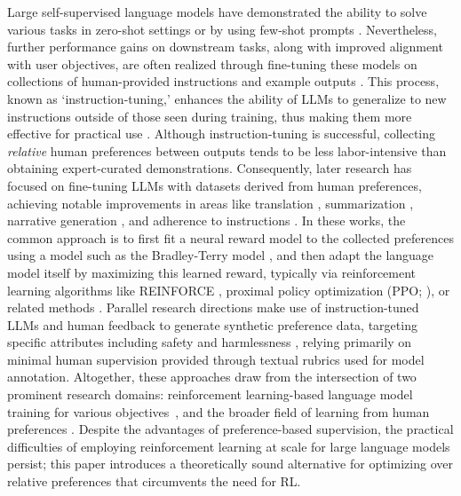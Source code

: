 Large self-supervised language models have demonstrated the ability to solve various tasks in zero-shot settings \citep{radford2019language} or by using few-shot prompts \citep{gpt3,megatron,chowdhery2022palm}. Nevertheless, further performance gains on downstream tasks, along with improved alignment with user objectives, are often realized through fine-tuning these models on collections of human-provided instructions and example outputs \citep{mishra-etal-2022-cross,sanh2022multitask,chung2022scaling,thoppilan2022lamda}. This process, known as `instruction-tuning,' enhances the ability of LLMs to generalize to new instructions outside of those seen during training, thus making them more effective for practical use \citep{chung2022scaling}. Although instruction-tuning is successful, collecting \textit{relative} human preferences between outputs tends to be less labor-intensive than obtaining expert-curated demonstrations. Consequently, later research has focused on fine-tuning LLMs with datasets derived from human preferences, achieving notable improvements in areas like translation \citep{kreutzer-etal-2018-reliability}, summarization \citep{stiennon2022learning,ziegler2020finetuning}, narrative generation \citep{ziegler2020finetuning}, and adherence to instructions \citep{ouyang2022training,ramamurthy2023is}. In these works, the common approach is to first fit a neural reward model to the collected preferences using a model such as the Bradley-Terry model \citep{bradley1952rankanalysis}, and then adapt the language model itself by maximizing this learned reward, typically via reinforcement learning algorithms like REINFORCE \citep{williams1992reinforce}, proximal policy optimization (PPO; \cite{schulman2017proximal}), or related methods \citep{ramamurthy2023is}. Parallel research directions make use of instruction-tuned LLMs and human feedback to generate synthetic preference data, targeting specific attributes including safety and harmlessness \citep{bai2022constitutional}, relying primarily on minimal human supervision provided through textual rubrics used for model annotation. Altogether, these approaches draw from the intersection of two prominent research domains: reinforcement learning-based language model training for various objectives~\citep{Ranzato2015SequenceLT,paulus2018a,wu2018learning}, and the broader field of learning from human preferences \citep{christiano2017deep,kupcsik2018learning}. Despite the advantages of preference-based supervision, the practical difficulties of employing reinforcement learning at scale for large language models persist; this paper introduces a theoretically sound alternative for optimizing over relative preferences that circumvents the need for RL.

